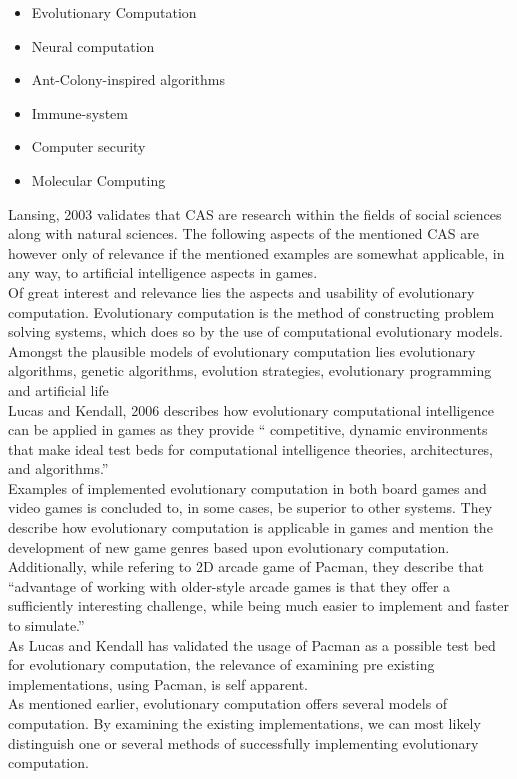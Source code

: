	\begin{itemize}
	\item Evolutionary Computation
	\item Neural computation
	\item Ant-Colony-inspired algorithms
	\item Immune-system
	\item Computer security
	\item Molecular Computing
	 \end{itemize}

Lansing, 2003 \cite{Lansing2003} validates that CAS are research within the fields of social sciences along with natural sciences.  The following aspects of the mentioned CAS are however only of relevance if the mentioned examples are somewhat applicable, in any way, to artificial intelligence aspects in games.\\
Of great interest and relevance lies the aspects and usability of evolutionary computation. Evolutionary computation is the method of constructing problem solving systems, which does so by the use of computational evolutionary models.\cite{Howe2010} Amongst the plausible models of evolutionary computation lies evolutionary algorithms, genetic algorithms, evolution strategies, evolutionary programming and artificial life\cite{Howe2010}\\

Lucas and Kendall, 2006 \cite{Lucas2006} describes how evolutionary computational intelligence can be applied in games as they provide  \enquote{ competitive, dynamic
environments that make ideal test beds
for computational intelligence theories,
architectures, and algorithms.}\cite[pp. 10]{Lucas2006}\\
Examples of implemented evolutionary computation in both board games and video games is concluded to, in some cases, be superior to other systems. They describe how evolutionary computation is applicable in games and mention the development of new game genres based upon evolutionary computation. Additionally, while refering to 2D arcade game of Pacman, they describe that \enquote{advantage
of working with older-style arcade games is that they
offer a sufficiently interesting challenge, while being much
easier to implement and faster to simulate.} \cite[pp 15]{Lucas2006} \\

As Lucas and Kendall has validated the usage of Pacman as a possible test bed for evolutionary computation, the relevance of examining pre existing implementations, using Pacman, is self apparent.\\
As mentioned earlier, evolutionary computation offers several models of computation. By examining the existing implementations, we can most likely distinguish one or several methods of successfully implementing evolutionary computation.

